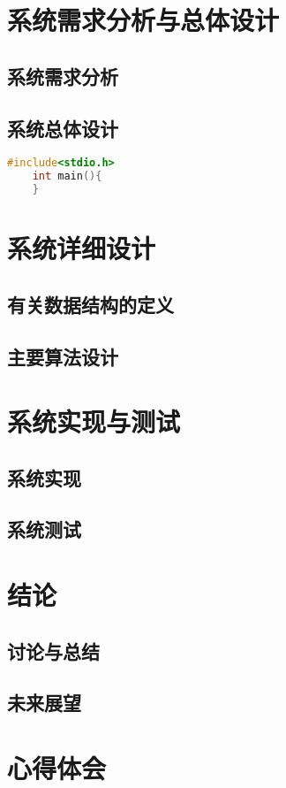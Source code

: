 \documentclass{ctexrep}
\begin{document}
\chapter{系统需求分析与总体设计}
\section{系统需求分析}
\section{系统总体设计}


\begin{lstlisting}[language=C]
    #include<stdio.h>
    int main(){
    }
\end{lstlisting}


\chapter{系统详细设计}
\section{有关数据结构的定义}
\section{主要算法设计}


\chapter{系统实现与测试}
\section{系统实现}
\section{系统测试}


\chapter{结论}
\section{讨论与总结}
\section{未来展望}

\chapter{心得体会}



  
\end{document}
